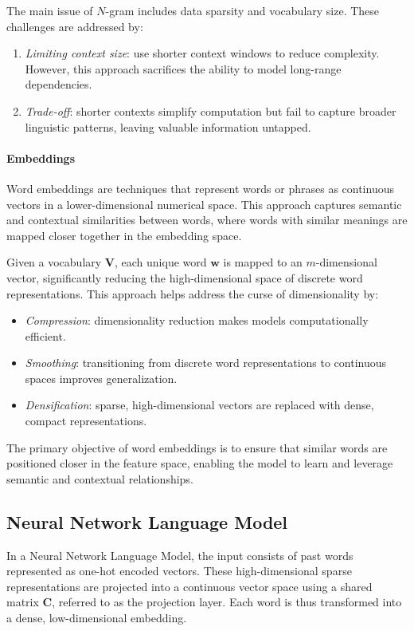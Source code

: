 The main issue of $N$-gram includes data sparsity and vocabulary size. 
These challenges are addressed by:
\begin{enumerate}
    \item \textit{Limiting context size}: use shorter context windows to reduce complexity. 
        However, this approach sacrifices the ability to model long-range dependencies.
    \item \textit{Trade-off}: shorter contexts simplify computation but fail to capture broader linguistic patterns, leaving valuable information untapped.
\end{enumerate}

\paragraph*{Embeddings}
Word embeddings are techniques that represent words or phrases as continuous vectors in a lower-dimensional numerical space. 
This approach captures semantic and contextual similarities between words, where words with similar meanings are mapped closer together in the embedding space.

Given a vocabulary $\mathbf{V}$, each unique word $\mathbf{w}$ is mapped to an $m$-dimensional vector, significantly reducing the high-dimensional space of discrete word representations.
This approach helps address the curse of dimensionality by:
\begin{itemize}
    \item \textit{Compression}: dimensionality reduction makes models computationally efficient.
    \item \textit{Smoothing}: transitioning from discrete word representations to continuous spaces improves generalization.
    \item \textit{Densification}: sparse, high-dimensional vectors are replaced with dense, compact representations.
\end{itemize}
The primary objective of word embeddings is to ensure that similar words are positioned closer in the feature space, enabling the model to learn and leverage semantic and contextual relationships.

\subsection{Neural Network Language Model}
In a Neural Network Language Model, the input consists of past words represented as one-hot encoded vectors. 
These high-dimensional sparse representations are projected into a continuous vector space using a shared matrix $\mathbf{C}$, referred to as the projection layer. 
Each word is thus transformed into a dense, low-dimensional embedding.

